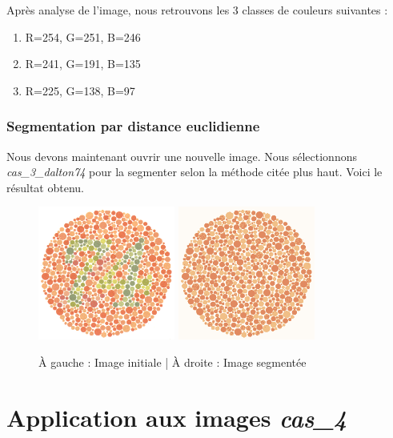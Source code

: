 \documentclass[a4paper]{article}
\begin{document}
Après analyse de l'image, nous retrouvons les 3 classes de couleurs suivantes :

\begin{enumerate}
  \item R=254, G=251, B=246
  \item R=241, G=191, B=135
  \item R=225, G=138, B=97
\end{enumerate}

\subsubsection{Segmentation par distance euclidienne}

Nous devons maintenant ouvrir une nouvelle image. Nous sélectionnons {\em cas\_3\_dalton74} pour la segmenter selon la méthode citée plus haut. Voici le résultat obtenu.

\begin{figure}[H]
\begin{center}
\includegraphics[width=170px]{../base/cas_3_dalton74.png}
\includegraphics[width=170px]{../resultats/cas_3_dalton74_seg.png}
\end{center}
\caption{À gauche : Image initiale | À droite : Image segmentée}
\end{figure}

\clearpage
\section{Application aux images {\em cas\_4}}
\end{document}
